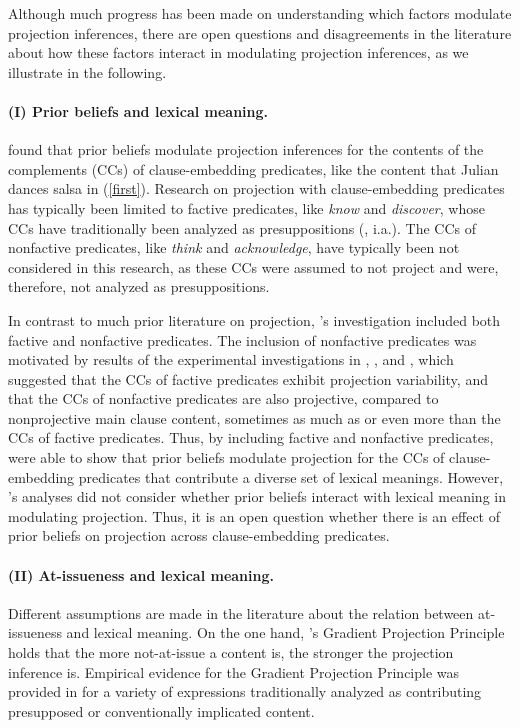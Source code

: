 \documentclass[11pt,fleqn]{article}
\newcommand{\6}{\mbox{$[\hspace*{-.6mm}[$}}
\newcommand{\9}{\mbox{$]\hspace*{-.6mm}]$}}
\newcommand{\citepos}[1]{\citeauthor{#1}'s \citeyear{#1}}
\begin{document}
Although much progress has been made on understanding which factors modulate projection inferences, there are open questions and disagreements in the literature about how these factors interact in modulating projection inferences, as we illustrate in the following.

\paragraph{(I) Prior beliefs and lexical meaning.} \citealt{degen-tonhauser-openmind} found that prior beliefs modulate projection inferences for the contents of the complements (CCs) of clause-embedding predicates, like the content that Julian dances salsa in (\ref{first}). Research on projection with clause-embedding predicates has typically been limited to factive predicates, like {\em know} and {\em discover}, whose CCs have traditionally been analyzed as presuppositions (\citealt{kiparsky-kiparsky70,karttunen71b}, i.a.). The CCs of nonfactive predicates, like {\em think} and {\em acknowledge}, have typically been not considered in this research, as these CCs were assumed to not project and were, therefore,  not analyzed as presuppositions. 

In contrast to much prior literature on projection, \citepos{degen-tonhauser-openmind} investigation included both factive and nonfactive predicates. The inclusion of nonfactive predicates was motivated by results of the experimental investigations in \citealt{demarneffe-etal-sub23}, \citealt{tbd-variability}, and \citealt{degen-tonhauser-language}, which suggested that the CCs of factive predicates exhibit projection variability, and that the CCs of nonfactive predicates are also projective, compared to nonprojective main clause content, sometimes as much as or even more than the CCs of factive predicates. Thus, by including factive and nonfactive predicates, \citealt{degen-tonhauser-openmind} were able to show that prior beliefs modulate projection for the CCs of clause-embedding predicates that contribute a diverse set of lexical meanings. However, \citepos{degen-tonhauser-openmind} analyses did not consider whether prior beliefs interact with lexical meaning in modulating projection. Thus, it is an open question whether there is an effect of prior beliefs on projection across clause-embedding predicates. 

\paragraph{(II) At-issueness and lexical meaning.} Different assumptions are made in the literature about the relation between at-issueness and lexical meaning. On the one hand, \citepos{tbd-variability} Gradient Projection Principle holds that the more not-at-issue a content is, the stronger the projection inference is. Empirical evidence for the Gradient Projection Principle was provided in \citealt{tbd-variability} for a variety of expressions traditionally analyzed as contributing presupposed or conventionally implicated content.
\end{document}

